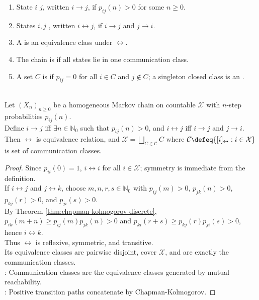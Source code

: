 \begin{definition} \label{def:markov-state-communication} 
\begin{enumerate}[label=(\roman*)]
\setlength{\itemsep}{0pt}
\item State $i$  $j$, written $i\to j$, if $p_{ij}(n)>0$ for some $n\geq0$.
\item States $i,j$ , written $i\leftrightarrow j$, if $i\to j$ and $j\to i$.
\item A  is an equivalence class under $\leftrightarrow$.
\item The chain is  if all states lie in one communication class.
\item A set $C$ is  if $p_{ij}=0$ for all $i\in C$ and $j\notin C$; a singleton closed class is an .
\end{enumerate}
\end{definition}

\begin{proposition} \label{prop:communication-equivalence-classes} \\
Let $(X_n)_{n\geq0}$ be a homogeneous Markov chain on countable $\mathcal{X}$ with $n$-step probabilities $p_{ij}(n)$.\\
Define $i\to j$ iff $\exists n\in\mathbb{N}_0$ such that $p_{ij}(n)>0$, and $i\leftrightarrow j$ iff $i\to j$ and $j\to i$.\\
Then $\leftrightarrow$ is equivalence relation, and $\mathcal{X}=\bigsqcup\limits_{C\in\mathcal{C}}C$ where $\mathcal{C}\defeq\{[i]_{\leftrightarrow}:i\in\mathcal{X}\}$ is set of communication classes.
\begin{proof} Since $p_{ii}(0)=1$, $i\leftrightarrow i$ for all $i\in\mathcal{X}$; symmetry is immediate from the definition.\\
If $i\leftrightarrow j$ and $j\leftrightarrow k$, choose $m,n,r,s\in\mathbb{N}_0$ with $p_{ij}(m)>0$, $p_{jk}(n)>0$, $p_{kj}(r)>0$, and $p_{ji}(s)>0$.\\
By Theorem \ref{thm:chapman-kolmogorov-discrete}, $p_{ik}(m+n)\geq p_{ij}(m)p_{jk}(n)>0$ and $p_{ki}(r+s)\geq p_{kj}(r)p_{ji}(s)>0$, hence $i\leftrightarrow k$.\\
Thus $\leftrightarrow$ is reflexive, symmetric, and transitive.\\
Its equivalence classes are pairwise disjoint, cover $\mathcal{X}$, and are exactly the communication classes.\\
: Communication classes are the equivalence classes generated by mutual reachability.\\
: Positive transition paths concatenate by Chapman-Kolmogorov.
\end{proof}
\end{proposition}


